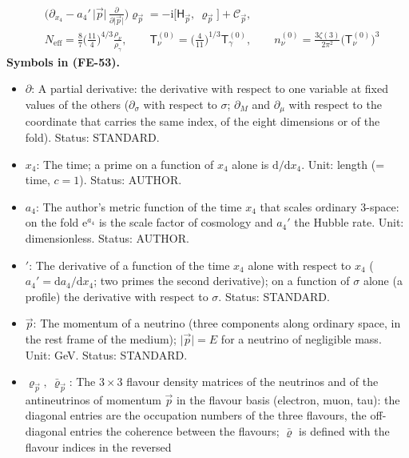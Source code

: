 \documentclass[
  10pt,
]{article}
\providecommand{\tightlist}{%
  \setlength{\itemsep}{0pt}\setlength{\parskip}{0pt}}
\begin{document}
\[
\begin{aligned}
&\Big(\partial_{x_4} - a_4'\,\lvert\vec p\rvert\,\frac{\partial}{\partial\lvert\vec p\rvert}\Big)\varrho_{\vec p}
 = -\mathrm{i}\big[\mathsf{H}_{\vec p},\ \varrho_{\vec p}\big] + \mathcal{C}_{\vec p},\\
&N_{\mathrm{eff}} = \frac87\Big(\frac{11}{4}\Big)^{4/3}\frac{\rho_\nu}{\rho_\gamma},\qquad
 \mathsf{T}_\nu^{(0)} = \Big(\frac{4}{11}\Big)^{1/3}\mathsf{T}_\gamma^{(0)},\qquad
 n_\nu^{(0)} = \frac{3\zeta(3)}{2\pi^2}\big(\mathsf{T}_\nu^{(0)}\big)^3
\end{aligned} \tag{FE-53}
\] \textbf{Symbols in (FE-53).}

\begin{itemize}
\tightlist
\item
  \(\partial\): A partial derivative: the derivative with respect to one
  variable at fixed values of the others (\(\partial_\sigma\) with
  respect to \(\sigma\); \(\partial_M\) and \(\partial_\mu\) with
  respect to the coordinate that carries the same index, of the eight
  dimensions or of the fold). Status: STANDARD.
\item
  \(x_4\): The time; a prime on a function of \(x_4\) alone is
  \(\mathrm{d}/\mathrm{d}x_4\). Unit: length (= time, \(c = 1\)).
  Status: AUTHOR.
\item
  \(a_4\): The author's metric function of the time \(x_4\) that scales
  ordinary 3-space: on the fold \(\mathrm{e}^{a_4}\) is the scale factor
  of cosmology and \(a_4'\) the Hubble rate. Unit: dimensionless.
  Status: AUTHOR.
\item
  \({}'\): The derivative of a function of the time \(x_4\) alone with
  respect to \(x_4\) (\(a_4' = \mathrm{d}a_4/\mathrm{d}x_4\); two primes
  the second derivative); on a function of \(\sigma\) alone (a profile)
  the derivative with respect to \(\sigma\). Status: STANDARD.
\item
  \(\vec p\): The momentum of a neutrino (three components along
  ordinary space, in the rest frame of the medium);
  \(\lvert\vec p\rvert = E\) for a neutrino of negligible mass. Unit:
  GeV. Status: STANDARD.
\item
  \(\varrho_{\vec p},\ \bar\varrho_{\vec p}\): The \(3 \times 3\)
  flavour density matrices of the neutrinos and of the antineutrinos of
  momentum \(\vec p\) in the flavour basis (electron, muon, tau): the
  diagonal entries are the occupation numbers of the three flavours, the
  off-diagonal entries the coherence between the flavours;
  \(\bar\varrho\) is defined with the flavour indices in the reversed

\end{itemize}
\end{document}

